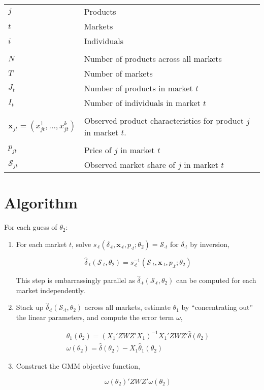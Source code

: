 \documentclass[parskip=half]{scrartcl}
\begin{document}
\begin{tabular}{l l}
	\(j\) & Products \\
	\(t\) & Markets \\
	\(i\) & Individuals \\
	\\
	\(N\) & Number of products across all markets \\
	\(T\) & Number of markets \\
	\(J_t\) & Number of products in market \(t\) \\
	\(I_t\) & Number of individuals in market \(t\) \\
	\\
	\(\boldsymbol{x}_{jt} = (x^1_{jt}, \dotsc, x^k_{jt})\) & Observed product characteristics for product \(j\) in market \(t\). \\
	\\
	\(p_{jt}\) & Price of \(j\) in market \(t\) \\
	$\mathcal{S}_{jt}$ & Observed market share of \(j\) in market \(t\)
	
\end{tabular}


\section{Algorithm}

For each guess of \(\theta_2\):

\begin{enumerate}

\item For each market \(t\), solve \(s_{\cdot t}(\delta_{\cdot t}, \boldsymbol{x}_{\cdot t}, p_{\cdot t}; \theta_2) = \mathcal{S}_{\cdot t}\) for \(\delta_{\cdot t}\) by inversion,


\begin{equation}
\hat\delta_{\cdot t}( \mathcal{S}_{\cdot t}, \theta_2) = s^{-1}_{\cdot t}(\mathcal{S}_{.t}, \boldsymbol{x}_{.t}, p_{.t}; \theta_2)
\end{equation}

This step is embarrassingly parallel as \(\hat\delta_{\cdot t}( \mathcal{S}_{\cdot t}, \theta_2)\) can be computed for each market independently.

\item Stack up \(\hat\delta_{\cdot t}( \mathcal{S}_{\cdot t}, \theta_2)\) across all markets, estimate \(\theta_1\) by ``concentrating out'' the linear parameters, and compute the error term \(\omega\),

\begin{gather}
\hat{\theta}_1(\theta_2) = (X_1'ZWZ'X_1)^{-1}X_1'ZWZ'\hat{\delta}(\theta_2) \\
\omega(\theta_2) = \hat{\delta}(\theta_2) - X_1 \hat{\theta}_1(\theta_2)
\end{gather}

\item Construct the GMM objective function,

\begin{equation}
\omega(\theta_2)' Z W Z' \omega(\theta_2)
\end{equation}

\end{enumerate}
\end{document}
